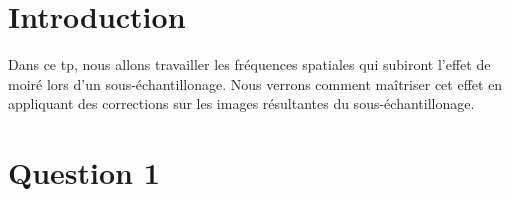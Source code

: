 \documentclass[a4paper,12pt]{report}
\begin{document}


\setcounter{page}{1} 
\newpage

\section*{Introduction}

Dans ce tp, nous allons travailler les fréquences spatiales qui subiront l'effet de moiré lors d'un sous-échantillonage. Nous verrons comment maîtriser cet effet en appliquant des corrections sur les images résultantes du sous-échantillonage.


\section*{Question 1}
\end{document}
